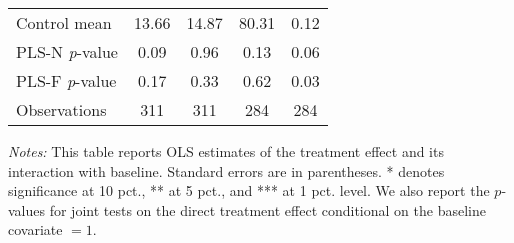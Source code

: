 \begin{table}[ht]
{\begin{threeparttable}
\begin{tabular}{l*{4}{c}}
Control mean    &    13.66         &    14.87         &    80.31         &     0.12         \\
PLS-N \emph{p}-value&     0.09         &     0.96         &     0.13         &     0.06         \\
PLS-F \emph{p}-value&     0.17         &     0.33         &     0.62         &     0.03         \\
Observations    &      311         &      311         &      284         &      284         \\
\bottomrule \end{tabular} \begin{tablenotes}[flushleft] \footnotesize \item \emph{Notes:} This table reports OLS estimates of the treatment effect and its interaction with baseline. Standard errors are in parentheses. * denotes significance at 10 pct., ** at 5 pct., and *** at 1 pct. level. We also report the \(p\)-values for joint tests on the direct treatment effect conditional on the baseline covariate $= 1$. \end{tablenotes} \end{threeparttable} } \end{table}

